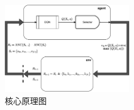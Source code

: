 \begin{figure}[hptb]
    \centering
    \includegraphics[width=0.49\textwidth]{核心原理图.pdf}
    \caption{核心原理图}
    \label{fig:核心原理图}
\end{figure}